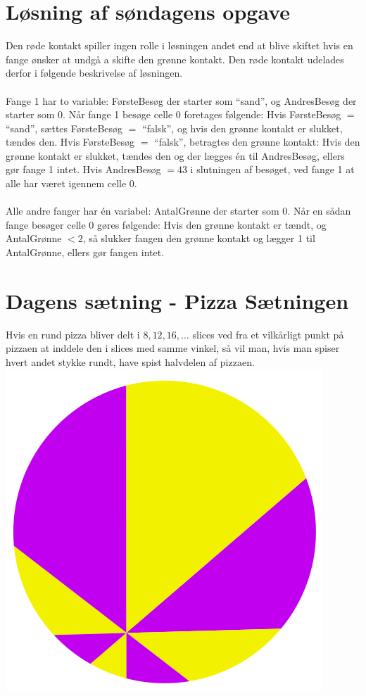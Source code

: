 \begin{minipage}[t]{100mm}
\vspace{3mm}

\section*{Løsning af søndagens opgave}
Den røde kontakt spiller ingen rolle i løsningen andet end at blive skiftet hvis en fange ønsker at undgå a skifte den grønne kontakt. Den røde kontakt udelades derfor i følgende beskrivelse af løsningen.
 \\ \\
Fange 1 har to variable: FørsteBesøg der starter som ``sand'', og AndresBesøg der starter som $0$. Når fange 1 besøge celle 0 foretages følgende: Hvis FørsteBesøg $=$ ``sand'', sættes FørsteBesøg $=$ ``falsk'', og hvis den grønne kontakt er slukket, tændes den. Hvis FørsteBesøg $=$ ``falsk'', betragtes den grønne kontakt: Hvis den grønne kontakt er slukket, tændes den og der lægges én til AndresBesøg, ellers gør fange 1 intet. Hvis AndresBesøg $=43$ i slutningen af besøget, ved fange 1 at alle har været igennem celle 0.
 \\ \\
Alle andre fanger har én variabel: AntalGrønne der starter som $0$. Når en sådan fange besøger celle 0 gøres følgende: Hvis den grønne kontakt er tændt, og AntalGrønne $<2$, så slukker fangen den grønne kontakt og lægger 1 til AntalGrønne, ellers gør fangen intet.

\section*{Dagens sætning - Pizza Sætningen}
Hvis en rund pizza bliver delt i $8, 12, 16, \dots$ slices ved fra et vilkårligt punkt på pizzaen at inddele den i slices med samme vinkel, så vil man, hvis man spiser hvert andet stykke rundt, have spist halvdelen af pizzaen.
\\
\includegraphics[width=\textwidth]{Pizzathm.png}
\end{minipage}
